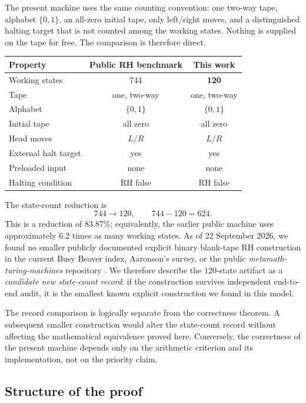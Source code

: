 \documentclass[10pt]{article}
\theoremstyle{definition}
\begin{document}
The present machine uses the same counting convention: one two-way tape,
alphabet $\{0,1\}$, an all-zero initial tape, only left/right moves, and a
distinguished halting target that is not counted among the working states.
Nothing is supplied on the tape for free. The comparison is therefore direct.

\begin{center}
\begin{tabular}{@{}lcc@{}}\toprule
Property & Public RH benchmark & This work \\\midrule
Working states & 744 & \textbf{120} \\
Tape & one, two-way & one, two-way \\
Alphabet & $\{0,1\}$ & $\{0,1\}$ \\
Initial tape & all zero & all zero \\
Head moves & $L/R$ & $L/R$ \\
External halt target & yes & yes \\
Preloaded input & none & none \\
Halting condition & RH false & RH false \\\bottomrule
\end{tabular}
\end{center}

The state-count reduction is
\[
744\longrightarrow120,
\qquad 744-120=624.
\]
This is a reduction of 83.87\%; equivalently, the earlier public machine uses
approximately 6.2 times as many working states. As of 22 September 2026, we
found no smaller publicly documented explicit binary blank-tape RH
construction in the current Busy Beaver index, Aaronson's survey, or the
public \emph{metamath-turing-machines} repository
\cite{Aaronson,RH744Repo,BBCryptids}. We therefore describe the
120-state artifact as a \emph{candidate new state-count record}: if the
construction survives independent end-to-end audit, it is the smallest known
explicit construction we found in this model.

The record comparison is logically separate from the correctness theorem. A
subsequent smaller construction would alter the state-count record without
affecting the mathematical equivalence proved here. Conversely, the
correctness of the present machine depends only on the arithmetic criterion
and its implementation, not on the priority claim.

\subsection{Structure of the proof}
\end{document}
